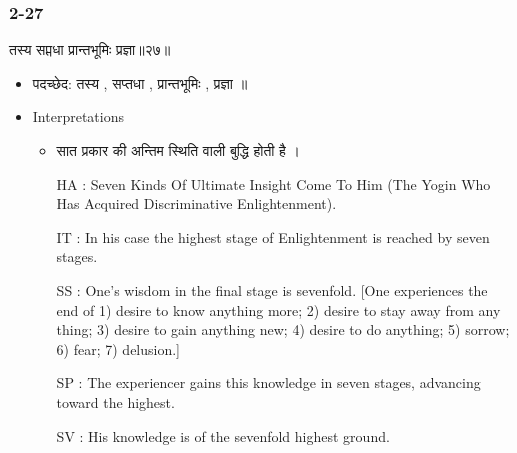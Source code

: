 \begin{frame}[fragile]\frametitle{2-27}
\begin{sanskrit}
तस्य सप्तधा प्रान्तभूमिः प्रज्ञा॥२७॥
\end{sanskrit}

	\begin{itemize}
	\item पदच्छेद: तस्य , सप्तधा , प्रान्तभूमिः , प्रज्ञा ॥
	\item Interpretations
		\begin{itemize}
		\item सात प्रकार की अन्तिम स्थिति वाली बुद्धि होती है ।
		\item [HA]: Seven Kinds Of Ultimate Insight Come To Him (The Yogin Who Has Acquired Discriminative Enlightenment).
		\item [IT]: In his case the highest stage of Enlightenment is reached by seven stages.
		\item [SS]: One’s wisdom in the final stage is sevenfold. [One experiences the end of 1) desire to know anything more; 2) desire to stay away from any thing; 3) desire to gain anything new; 4) desire to do anything; 5) sorrow; 6) fear; 7) delusion.]
		\item [SP]: The experiencer gains this knowledge in seven stages, advancing toward the highest.
		\item [SV]: His knowledge is of the sevenfold highest ground. 
		\end{itemize}
	\end{itemize}
	
\end{frame}


